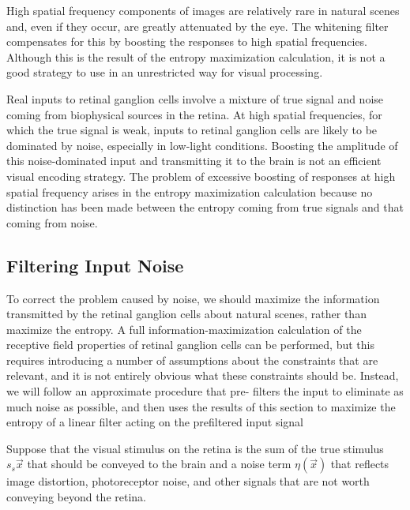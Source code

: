 \begin{rem}
  High spatial frequency components of images are relatively rare in natural scenes and,
even if they occur, are greatly attenuated by the eye. The whitening filter
compensates for this by boosting the responses to high spatial frequencies. Although this is the result of the entropy maximization calculation, it is not a good strategy to use in an unrestricted way for visual processing.
\end{rem}

\begin{rem}
  Real inputs to retinal ganglion cells involve a mixture of true signal and noise
coming from biophysical sources in the retina. At high spatial frequencies,
for which the true signal is weak, inputs to retinal ganglion cells are likely
to be dominated by noise, especially in low-light conditions. Boosting the
amplitude of this noise-dominated input and transmitting it to the brain is
not an efficient visual encoding strategy. The problem of excessive boosting of responses at high spatial frequency arises in the entropy maximization calculation because no distinction has
been made between the entropy coming from true signals and that coming from noise.
\end{rem}



\subsection{Filtering Input Noise}
\begin{rem}
  To correct the problem caused by noise, we should maximize the information
transmitted by the retinal ganglion cells about natural scenes, rather than
maximize the entropy. A full information-maximization calculation of the
receptive field properties of retinal ganglion cells can be performed, but
this requires introducing a number of assumptions about the constraints
that are relevant, and it is not entirely obvious what these constraints
should be. Instead, we will follow an approximate procedure that pre-
filters the input to eliminate as much noise as possible, and then uses the
results of this section to maximize the entropy of a linear filter acting on
the prefiltered input signal
\end{rem}

\begin{asm}
  Suppose that the visual stimulus on the retina is the sum of the
  true stimulus $s_{s}\vec{x}$   that should be conveyed to the brain
  and a noise term $\eta(\vec{x})$ that reflects image distortion,
  photoreceptor noise, and other signals that are not worth conveying beyond the retina.
\end{asm}

